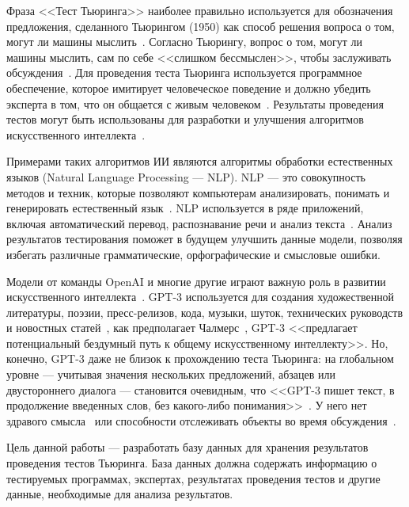 
Фраза <<Тест Тьюринга>> наиболее правильно используется для обозначения предложения, сделанного Тьюрингом (1950) как способ решения вопроса о том, могут ли машины мыслить~\cite{sep-turing-test}. 
Согласно Тьюрингу, вопрос о том, могут ли машины мыслить, сам по себе <<слишком бессмыслен>>, чтобы заслуживать обсуждения~\cite{10.1093/mind/LIX.236.433}.
Для проведения теста Тьюринга используется программное обеспечение, которое имитирует человеческое поведение и должно убедить эксперта в том, что он общается с живым человеком~\cite{10.1093/mind/LIX.236.433}.
Результаты проведения тестов могут быть использованы для разработки и улучшения алгоритмов искусственного интеллекта~\cite{DBLP:journals/corr/abs-2106-11394}.

Примерами таких алгоритмов ИИ являются алгоритмы обработки естественных языков (Natural Language Processing --- NLP).
NLP --- это совокупность методов и техник, которые позволяют компьютерам анализировать, понимать и генерировать естественный язык~\cite{nlp}.
NLP используется в ряде приложений, включая автоматический перевод, распознавание речи и анализ текста~\cite{nlp}. 
Анализ результатов тестирования поможет в будущем улучшить данные модели, позволяя избегать различные грамматические, орфографические и смысловые ошибки. 

Модели от команды OpenAI и многие другие играют важную роль в развитии искусственного интеллекта~\cite{joublin2023glimpse}.
GPT-3 используется для создания художественной литературы, поэзии, пресс-релизов, кода, музыки, шуток, технических руководств и новостных статей~\cite{zong2022survey}, как предполагает Чалмерс~\cite{gpt3}, GPT-3 <<предлагает потенциальный бездумный путь к общему искусственному интеллекту>>. 
Но, конечно, GPT-3 даже не близок к прохождению теста Тьюринга: на глобальном уровне — учитывая значения нескольких предложений, абзацев или двустороннего диалога --- становится очевидным, что <<GPT-3 пишет текст, в продолжение введенных слов, без какого-либо понимания>>~\cite{gpt3-undersatnding}. 
У него нет здравого смысла~\cite{kojima2023large} или способности отслеживать объекты во время обсуждения~\cite{gpt3-track}. 

Цель данной работы --- разработать базу данных для хранения результатов проведения тестов Тьюринга. База данных должна содержать информацию о тестируемых программах, экспертах, результатах проведения тестов и другие данные, необходимые для анализа результатов.

